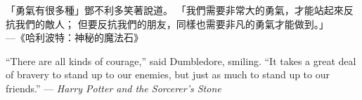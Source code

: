 \begin{acknowledgementszh}
\noindent 「勇氣有很多種」鄧不利多笑著說道。
「我們需要非常大的勇氣，才能站起來反抗我們的敵人；
但要反抗我們的朋友，同樣也需要非凡的勇氣才能做到。」\\
---《哈利波特：神秘的魔法石》
\end{acknowledgementszh}

\begin{acknowledgementsen}
\noindent ``There are all kinds of courage,'' said Dumbledore, smiling. 
``It takes a great deal of bravery to stand up to our enemies, 
but just as much to stand up to our friends.''
--- {\it Harry Potter and the Sorcerer's Stone}
\end{acknowledgementsen}